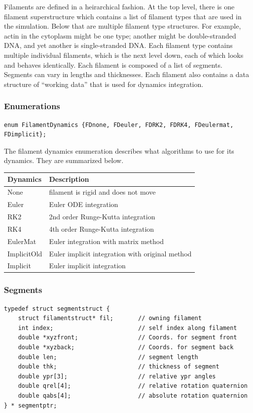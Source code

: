 \documentclass {scrbook}
\begin{document}
Filaments are defined in a heirarchical fashion. At the top level, there is one filament superstructure which contains a list of filament types that are used in the simulation. Below that are multiple filament type structures. For example, actin in the cytoplasm might be one type; another might be double-stranded DNA, and yet another is single-stranded DNA. Each filament type contains multiple individual filaments, which is the next level down, each of which looks and behaves identically. Each filament is composed of a list of segments. Segments can vary in lengths and thicknesses. Each filament also contains a data structure of ``working data'' that is used for dynamics integration.

\subsubsection{Enumerations}

\begin{lstlisting}
enum FilamentDynamics {FDnone, FDeuler, FDRK2, FDRK4, FDeulermat, FDimplicit};
\end{lstlisting}

The filament dynamics enumeration describes what algorithms to use for its dynamics. They are summarized below.

\begin{longtable}[c]{ll}
Dynamics & Description\\
\hline
None & filament is rigid and does not move\\
Euler & Euler ODE integration\\
RK2 & 2nd order Runge-Kutta integration \\
RK4 & 4th order Runge-Kutta integration \\
EulerMat & Euler integration with matrix method \\
ImplicitOld & Euler implicit integration with original method \\
Implicit & Euler implicit integration
\end{longtable}

\subsubsection{Segments}

\begin{lstlisting}
typedef struct segmentstruct {
    struct filamentstruct* fil;       // owning filament
    int index;                        // self index along filament
    double *xyzfront;                 // Coords. for segment front
    double *xyzback;                  // Coords. for segment back
    double len;                       // segment length
    double thk;                       // thickness of segment
    double ypr[3];                    // relative ypr angles
    double qrel[4];                   // relative rotation quaternion
    double qabs[4];                   // absolute rotation quaternion
} * segmentptr;
\end{lstlisting}
\end{document}
